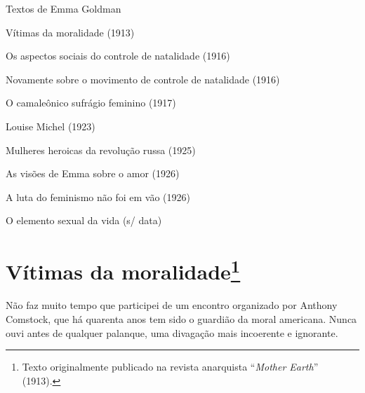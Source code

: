 Textos de Emma Goldman

Vítimas da moralidade (1913)

Os aspectos sociais do controle de natalidade (1916)

Novamente sobre o movimento de controle de natalidade (1916)

O camaleônico sufrágio feminino (1917)

Louise Michel (1923)

Mulheres heroicas da revolução russa (1925)

As visões de Emma sobre o amor (1926)

A luta do feminismo não foi em vão (1926)

O elemento sexual da vida (s/ data)




\chapter[Vítimas da moralidade (1913)]{Vítimas da moralidade\footnote[*]{Texto originalmente publicado na revista
  anarquista ``\emph{Mother Earth}'' (1913).}}

Não faz muito tempo que participei de um encontro organizado por Anthony
Comstock, que há quarenta anos tem sido o guardião da moral americana.
Nunca ouvi antes de qualquer palanque, uma divagação mais incoerente e
ignorante.

